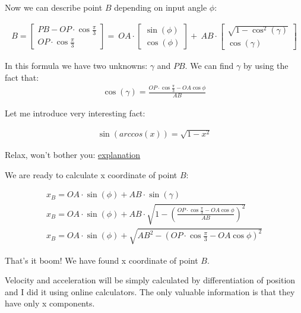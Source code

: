 \documentclass{article}
\begin{document}
Now we can describe point $B$ depending on input angle $\phi$:

\begin{align}
    B = \begin{bmatrix}
        PB - OP \cdot \cos{\frac{\pi}{3}} \\
        OP \cdot \cos{\frac{\pi}{3}}
    \end{bmatrix} = \
    OA \cdot \begin{bmatrix}
        \sin{(\phi)} \\
        \cos{(\phi)}
    \end{bmatrix} + \
    AB \cdot \begin{bmatrix}
        \sqrt{1 - \cos^2{(\gamma)}} \\
        \cos{(\gamma)}
    \end{bmatrix}
\end{align}

In this formula we have two unknowns: $\gamma$ and $PB$.
We can find $\gamma$ by using the fact that:
\begin{align}
    \cos{(\gamma)} = \frac{OP \cdot \cos{\frac{\pi}{3}} - OA \cos{\phi}}{AB}
\end{align}

Let me introduce very interesting fact:

\begin{align}
    \sin(arccos(x)) = \sqrt{1 - x^2}
\end{align}

Relax, won't bother you: \href{https://math.stackexchange.com/questions/345077/cos-arcsinx-sqrt1-x2-how}{explanation}

We are ready to calculate x coordinate of point $B$:

\begin{align}
    x_B = OA \cdot \sin{(\phi)} + AB \cdot \sin{(\gamma)}                                                         \\
    x_B = OA \cdot \sin{(\phi)} + AB \cdot \sqrt{1 - (\frac{OP \cdot \cos{\frac{\pi}{3}} - OA \cos{\phi}}{AB})^2} \\
    x_B = OA \cdot \sin{(\phi)} + \sqrt{AB^2 - (OP \cdot \cos{\frac{\pi}{3}} - OA \cos{\phi})^2}
\end{align}

That's it boom! We have found x coordinate of point $B$.

Velocity and acceleration will be simply calculated by differentiation of position
and I did it using online calculators. The only valuable information is that they have only x components.
\end{document}
